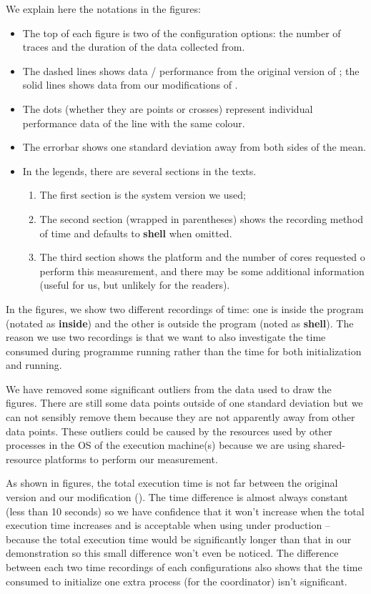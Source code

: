 We explain here the notations in the figures:
\begin{itemize}
	\item The top of each figure is two of the configuration options: the number of traces and the duration of the data collected from.
	\item The dashed lines shows data / performance from the original version of \dpy; the solid lines shows data from our modifications of \dpy.
	\item The dots (whether they are points or crosses) represent individual performance data of the line with the same colour.
	\item The errorbar shows one standard deviation away from both sides of the mean.
	\item In the legends, there are several sections in the texts.
	\begin{enumerate}
		\item The first section is the system version we used; 
		\item The second section (wrapped in parentheses) shows the recording method of time and defaults to \textbf{shell} when omitted.
		\item The third section shows the platform and the number of cores requested o perform this measurement, and there may be some additional information (useful for us, but unlikely for the readers).
	\end{enumerate}
\end{itemize}

In the figures, we show two different recordings of time: one is inside the program (notated as \textbf{inside}) and the other is outside the program (noted as \textbf{shell}). The reason we use two recordings is that we want to also investigate the time consumed during programme running rather than the time for both initialization and running.

We have removed some significant outliers from the data used to draw the figures. There are still some data points outside of one standard deviation but we can not sensibly remove them because they are not apparently away from other data points. These outliers could be caused by the resources used by other processes in the OS of the execution machine(s) because we are using shared-resource platforms to perform our measurement.

As shown in figures, the total execution time is not far between the original \dpy version and our modification (\tincdep). The time difference is almost always constant (less than 10 seconds) so we have confidence that it won't increase when the total execution time increases and is acceptable when using under production -- because the total execution time would be significantly longer than that in our demonstration so this small difference won't even be noticed. The difference between each two time recordings of each configurations also shows that the time consumed to initialize one extra process (for the coordinator) isn't significant.

